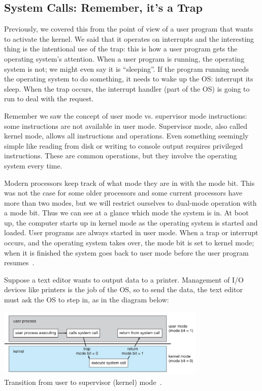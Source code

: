 \subsection*{System Calls: Remember, it's a Trap}

Previously, we covered this from the point of view of a user program that wants to activate the kernel. We said that it operates on interrupts and the interesting thing is the intentional use of the trap: this is how a user program gets the operating system's attention. When a user program is running, the operating system is not; we might even say it is ``sleeping''. If the program running needs the operating system to do something, it needs to wake up the OS: interrupt its sleep. When the trap occurs, the interrupt handler (part of the OS) is going to run to deal with the request.

Remember we saw the concept of user mode vs. supervisor mode instructions: some instructions are not available in user mode. Supervisor mode, also called kernel mode, allows all instructions and operations. Even something seemingly simple like reading from disk or writing to console output requires privileged instructions. These are common operations, but they involve the operating system every time.

Modern processors keep track of what mode they are in with the mode bit. This was not the case for some older processors and some current processors have more than two modes, but we will restrict ourselves to dual-mode operation with a mode bit. Thus we can see at a glance which mode the system is in. At boot up, the computer starts up in kernel mode as the operating system is started and loaded. User programs are always started in user mode. When a trap or interrupt occurs, and the operating system takes over, the mode bit is set to kernel mode; when it is finished the system goes back to user mode before the user program resumes~\cite{osc}.

Suppose a text editor wants to output data to a printer. Management of I/O devices like printers is the job of the OS, so to send the data, the text editor must ask the OS to step in, as in the diagram below:

\begin{center}
	\includegraphics[width=0.75\textwidth]{images/trap.png}\\
	Transition from user to supervisor (kernel) mode~\cite{osc}.
\end{center}


